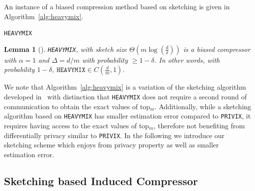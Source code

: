 \documentclass[twoside]{article}
\newtheorem{lemma}{Lemma}
\begin{document}
An instance of a biased compression method based on sketching is given in Algorithm~\ref{alg:heavymix}.
\begin{algorithm}[H]
\caption{\texttt{HEAVYMIX}  }\label{alg:heavymix}
\begin{algorithmic}[1]
\end{algorithmic}
\end{algorithm}


\begin{lemma}[\cite{ivkin2019communication}]
\texttt{HEAVYMIX}, with sketch size $\Theta\left(m\log\left(\frac{d}{\delta}\right)\right)$ is a biased compressor with $\alpha=1$ and  $\Delta=d/m$ with probability $\geq1-\delta$. In other words, with probability $1-\delta$, $\texttt{HEAVYMIX}\in C(\frac{d}{m},1)$. 
\end{lemma}

We note that Algorithm~\ref{alg:heavymix} is a variation of the sketching algorithm developed in~\cite{ivkin2019communication} with distinction that \texttt{HEAVYMIX} does not require a second round of communication to obtain the exact values of top$_m$. 
Additionally, while a sketching algorithm based on \texttt{HEAVYMIX} has smaller estimation error compared to \texttt{PRIVIX}, it requires having access to the exact values of top$_m$, therefore not benefiting from differentially privacy similar to \texttt{PRIVIX}. 
In the following we introduce our sketching scheme which enjoys from privacy property as well as smaller estimation error. 

\vspace{-0.05in}
\subsection{Sketching based Induced Compressor}
\vspace{-0.05in}
\end{document}
